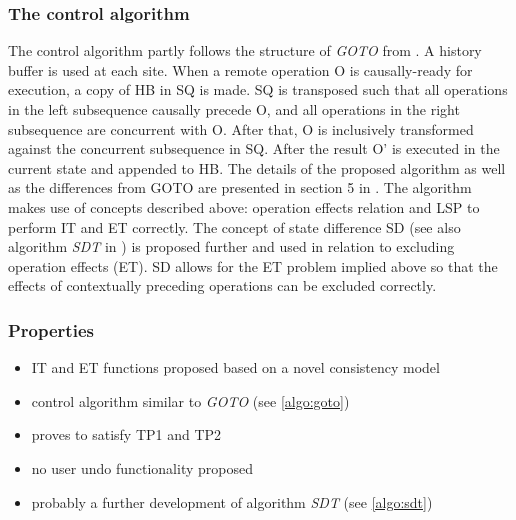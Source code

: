 \subsubsection{The control algorithm}
The control algorithm partly follows the structure of \emph{GOTO} from \cite{sun98b}. A history buffer is used at each site. When a remote operation O is causally-ready for execution, a copy of HB in SQ is made. SQ is transposed such that all operations in the left subsequence causally precede O, and all operations in the right subsequence are concurrent with O. After that, O is inclusively transformed against the concurrent subsequence in SQ. After the result O' is executed in the current state and appended to HB. The details of the proposed algorithm as well as the differences from GOTO are presented in section 5 in \cite{li04}. The algorithm makes use of concepts described above: operation effects relation and LSP to perform IT and ET correctly. The concept of state difference SD (see also algorithm \emph{SDT} in \cite{sdt}) is proposed further and used in relation to excluding operation effects (ET). SD allows for the ET problem implied above so that the effects of contextually preceding operations can be excluded correctly.

\subsubsection{Properties}
\begin{itemize}
 \item IT and ET functions proposed based on a novel consistency model
 \item control algorithm similar to \emph{GOTO} (see \ref{algo:goto})
 \item proves to satisfy TP1 and TP2
 \item no user undo functionality proposed
 \item probably a further development of algorithm \emph{SDT} (see \ref{algo:sdt})
\end{itemize}